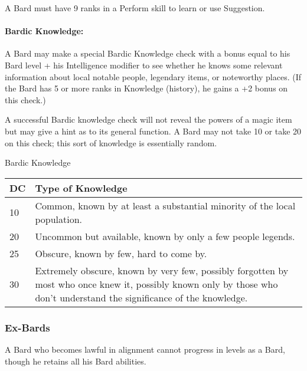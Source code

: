 A Bard must have 9 ranks in a Perform skill to learn or use Suggestion.
\paragraph{Bardic Knowledge:}
A Bard may make a special Bardic Knowledge check with a bonus equal to his Bard level + his Intelligence modifier to see whether he knows some relevant information about local notable people, 
legendary items, or noteworthy places. (If the Bard has 5 or more ranks in Knowledge (history), he gains a +2 bonus on this check.)

A successful Bardic knowledge check will not reveal the powers of a magic item but may give a hint as to its general function. 
A Bard may not take 10 or take 20 on this check; this sort of knowledge is essentially random.
\begin{tableonecolumn}
\caption{Bardic Knowledge}
\label{tab:BardicKnowledge}
\begin{tabular}{p{0.4cm}p{6cm}}
\toprule
DC &Type of Knowledge\\
\midrule
10 &Common, known by at least a substantial minority of the local population.\\
20 &Uncommon but available, known by only a few people legends.\\
25 &Obscure, known by few, hard to come by.\\
30 &Extremely obscure, known by very few, possibly forgotten by most who once knew it, possibly known only by those who don't understand the significance of the knowledge.\\
\bottomrule
\end{tabular}
\end{tableonecolumn}
\subsubsection{Ex-Bards}
A Bard who becomes lawful in alignment cannot progress in levels as a Bard, though he retains all his Bard abilities.